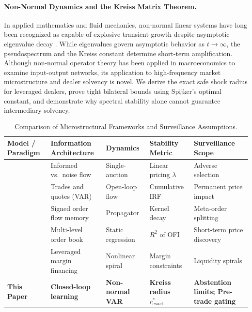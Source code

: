 \documentclass[12pt]{article}
\theoremstyle{definition}
\theoremstyle{remark}
\begin{document}
\paragraph{Non-Normal Dynamics and the Kreiss Matrix Theorem.}
In applied mathematics and fluid mechanics, non-normal linear systems have long been recognized as capable of explosive transient growth despite asymptotic eigenvalue decay \citep{kreiss1962,spijker1991,trefethen2005spectra}. While eigenvalues govern asymptotic behavior as $t \to \infty$, the pseudospectrum and the Kreiss constant determine short-term amplification. Although non-normal operator theory has been applied in macroeconomics to examine input-output networks, its application to high-frequency market microstructure and dealer solvency is novel. We derive the exact safe shock radius for leveraged dealers, prove tight bilateral bounds using Spijker's optimal constant, and demonstrate why spectral stability alone cannot guarantee intermediary solvency.

\begin{table}[htbp]
\centering\footnotesize
\caption{Comparison of Microstructural Frameworks and Surveillance Assumptions.}
\label{tab:lit_comparison}
\begin{tabularx}{\textwidth}{p{3.2cm}Xp{2.2cm}XX}\toprule
Model / Paradigm & Information Architecture & Dynamics & Stability Metric & Surveillance Scope \\\midrule
\citet{kyle1985continuous} & Informed vs.\ noise flow & Single-auction & Linear pricing $\lambda$ & Adverse selection \\
\citet{hasbrouck1991} & Trades and quotes (VAR) & Open-loop flow & Cumulative IRF & Permanent price impact \\
\citet{bouchaud2004fluctuations} & Signed order flow memory & Propagator & Kernel decay & Meta-order splitting \\
\citet{cont2014} & Multi-level order book & Static regression & $R^2$ of OFI & Short-term price discovery \\
\citet{brunnermeier2009} & Leveraged margin financing & Nonlinear spiral & Margin constraints & Liquidity spirals \\
\textbf{This Paper} & \textbf{Closed-loop learning} & \textbf{Non-normal VAR} & \textbf{Kreiss radius $r^*_{\text{exact}}$} & \textbf{Abstention limits; Pre-trade gating} \\\bottomrule
\end{tabularx}
\end{table}
\end{document}
